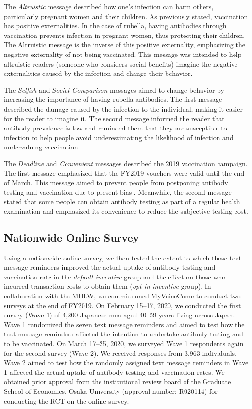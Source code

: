 \documentclass[
      12pt,
    a4paper
]{article}
\begin{document}
The \emph{Altruistic} message described how one's infection can harm others, particularly pregnant women and their children. As previously stated, vaccination has positive externalities. In the case of rubella, having antibodies through vaccination prevents infection in pregnant women, thus protecting their children. The Altruistic message is the inverse of this positive externality, emphasizing the negative externality of not being vaccinated. This message was intended to help altruistic readers (someone who considers social benefits) imagine the negative externalities caused by the infection and change their behavior.

The \emph{Selfish} and \emph{Social Comparison} messages aimed to change behavior by increasing the importance of having rubella antibodies. The first message described the damage caused by the infection to the individual, making it easier for the reader to imagine it. The second message informed the reader that antibody prevalence is low and reminded them that they are susceptible to infection to help people avoid underestimating the likelihood of infection and undervaluing vaccination.

The \emph{Deadline} and \emph{Convenient} messages described the 2019 vaccination campaign. The first message emphasized that the FY2019 vouchers were valid until the end of March. This message aimed to prevent people from postponing antibody testing and vaccination due to present bias \citep{ODonoghue2001}. Meanwhile, the second message stated that some people can obtain antibody testing as part of a regular health examination and emphasized its convenience to reduce the subjective testing cost.

\hypertarget{survey}{%
\subsection{Nationwide Online Survey}\label{survey}}

Using a nationwide online survey, we then tested the extent to which those text message reminders improved the actual uptake of antibody testing and vaccination rate in the \emph{default incentive} group and the effect on those who incurred transaction costs to obtain them (\emph{opt-in incentive} group). In collaboration with the MHLW, we commissioned MyVoiceCome to conduct two surveys at the end of FY2019. On February 15--17, 2020, we conducted the first survey (Wave 1) of 4,200 Japanese men aged 40--59 years living across Japan. Wave 1 randomized the seven text message reminders and aimed to test how the text message reminders affected the intention to undertake antibody testing and to be vaccinated. On March 17--25, 2020, we surveyed Wave 1 respondents again for the second survey (Wave 2). We received responses from 3,963 individuals. Wave 2 aimed to test how the randomly assigned text message reminders in Wave 1 affected the actual uptake of antibody testing and vaccination rates. We obtained prior approval from the institutional review board of the Graduate School of Economics, Osaka University (approval number: R020114) for conducting the RCT on the online survey.
\end{document}
